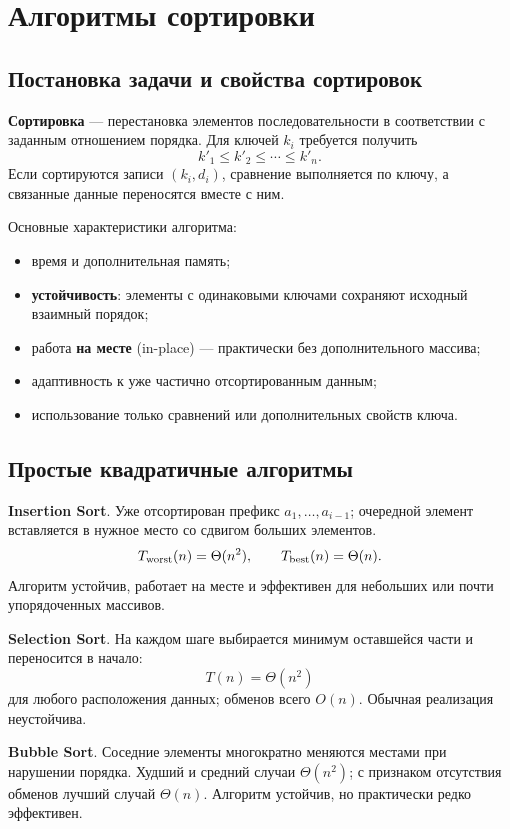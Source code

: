\section{Алгоритмы сортировки}

\subsection{Постановка задачи и свойства сортировок}

\textbf{Сортировка} --- перестановка элементов последовательности в соответствии с заданным отношением порядка. Для ключей $k_i$ требуется получить
\[
k'_1\le k'_2\le\cdots\le k'_n.
\]
Если сортируются записи $(k_i,d_i)$, сравнение выполняется по ключу, а связанные данные переносятся вместе с ним.

Основные характеристики алгоритма:
\begin{itemize}
\item время и дополнительная память;
\item \textbf{устойчивость}: элементы с одинаковыми ключами сохраняют исходный взаимный порядок;
\item работа \textbf{на месте} (in-place) --- практически без дополнительного массива;
\item адаптивность к уже частично отсортированным данным;
\item использование только сравнений или дополнительных свойств ключа.
\end{itemize}

\subsection{Простые квадратичные алгоритмы}

\textbf{Insertion Sort}. Уже отсортирован префикс $a_1,\ldots,a_{i-1}$; очередной элемент вставляется в нужное место со сдвигом больших элементов.
\[
T_{\rm worst}(n)=\Theta(n^2),
\qquad
T_{\rm best}(n)=\Theta(n).
\]
Алгоритм устойчив, работает на месте и эффективен для небольших или почти упорядоченных массивов.

\textbf{Selection Sort}. На каждом шаге выбирается минимум оставшейся части и переносится в начало:
\[
T(n)=\Theta(n^2)
\]
для любого расположения данных; обменов всего $O(n)$. Обычная реализация неустойчива.

\textbf{Bubble Sort}. Соседние элементы многократно меняются местами при нарушении порядка. Худший и средний случаи $\Theta(n^2)$; с признаком отсутствия обменов лучший случай $\Theta(n)$. Алгоритм устойчив, но практически редко эффективен.

